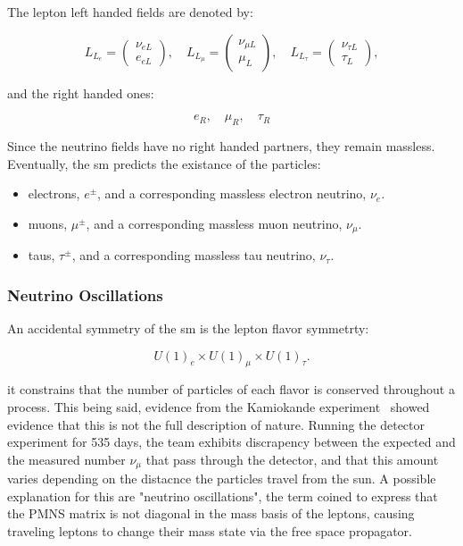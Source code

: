 \documentclass[thesis/Elad_Kliger_Thesis.tex]{subfiles}
\begin{document}
The lepton left handed fields are denoted by:

\begin{equation}
    \label{eq:lepton_lh_fields}
    L_{L_e} = \begin{pmatrix}
        \nu_{eL} \\
        e_{eL}
    \end{pmatrix}, \quad
    L_{L_\mu} = \begin{pmatrix}
        \nu_{\mu L} \\
        \mu_L
    \end{pmatrix}, \quad
    L_{L_\tau} = \begin{pmatrix}
        \nu_{\tau L} \\
        \tau_L
    \end{pmatrix},
\end{equation}

\noindent and the right handed ones:

\begin{equation}
    \label{eq:lepton_rh_fields}
    e_R, \quad \mu_R, \quad \tau_R
\end{equation}

Since the neutrino fields have no right handed partners, they remain massless. Eventually, the \gls{sm} predicts the existance of the particles:

\begin{itemize}
    \item electrons, $e^\pm$, and a corresponding massless electron neutrino, $\nu_e$.
    \item muons, $\mu^\pm$, and a corresponding massless muon neutrino, $\nu_\mu$.
    \item taus, $\tau^\pm$, and a corresponding massless tau neutrino, $\nu_\tau$.
\end{itemize}

\subsubsection{Neutrino Oscillations}

An accidental symmetry of the \gls{sm} is the lepton flavor symmetrty:

\begin{equation}
    \label{eq:lepton_flavor_symmetry}
    U(1)_e \times U(1)_\mu \times U(1)_\tau.
\end{equation}

\noindent it constrains that the number of particles of each flavor is conserved throughout a process. This being said, evidence from the Kamiokande experiment~\cite{SuperKamiokande_1998_Oscillations} showed evidence that this is not the full description of nature. Running the detector experiment for 535 days, the team exhibits discrapency between the expected and the measured number $\nu_\mu$ that pass through the detector, and that this amount varies depending on the distacnce the particles travel from the sun. A possible explanation for this are "neutrino oscillations", the term coined to express that the PMNS matrix is not diagonal in the mass basis of the leptons, causing traveling leptons to change their mass state via the free space propagator.
\end{document}
